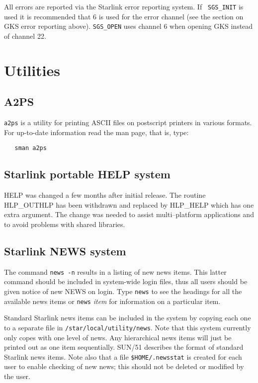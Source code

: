 All errors are reported via the Starlink error reporting system. If {\tt
SGS\_INIT} is used it is recommended that 6 is used for the error channel (see
the section on GKS error reporting above). {\tt SGS\_OPEN} uses channel 6 when
opening GKS instead of channel 22.


\section{Utilities}


\subsection{A2PS}

{\tt a2ps} is a utility for printing ASCII files on postscript printers in
various formats.
For up-to-date information read the man page, that is, type:
\begin{verbatim}
   sman a2ps
\end{verbatim}

\subsection{Starlink portable HELP system}


HELP was changed a few months after initial release. The routine
HLP\_OUTHLP has been withdrawn and replaced by HLP\_HELP which has
one extra argument. The change was needed to assist multi--platform
applications and to avoid problems with shared libraries.

\subsection{Starlink NEWS system}

The command {\tt news -n} results in a listing of new news items.
This latter command  should be included in system-wide login
files, thus all users should be given notice of new
NEWS on login.
Type {\tt news} to see the headings for all the available news items
or {\tt news} {\sl item} for information on a particular item.

Standard Starlink news items can be included in the system
by copying each one to a separate file in
{\tt /star/local/utility/news}. Note that this system currently only
copes with one level of news. Any hierarchical news items
will just be printed out as one item sequentially.
SUN/51 describes the format of standard Starlink news items.
Note also that a file {\tt\$HOME/.newsstat} is created for each user to
enable checking of new news; this should not be deleted
or modified by the user.


